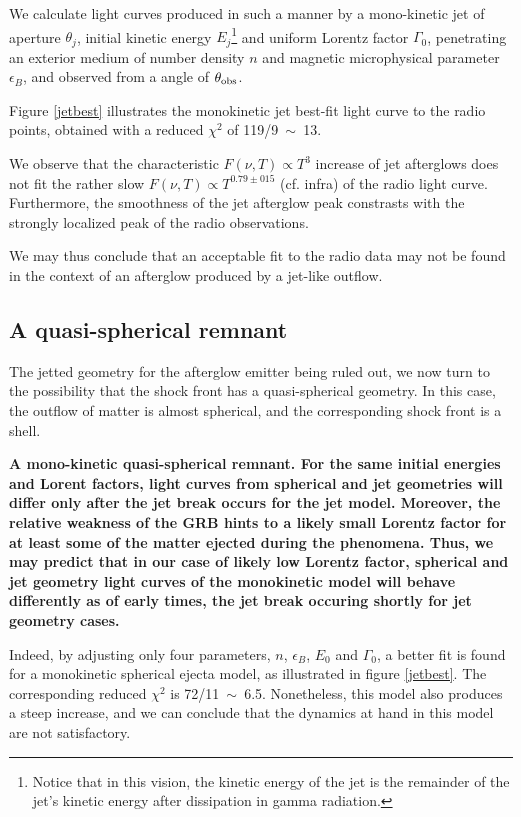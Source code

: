 We calculate light curves produced in such a manner by a mono-kinetic jet of aperture $\theta_j$, initial kinetic energy $E_j$\footnote{Notice that in this vision, the kinetic energy of the jet is the remainder of the jet's kinetic energy after dissipation in gamma radiation.} and uniform Lorentz factor $\Gamma_0$, penetrating an exterior medium of number density $n$ and magnetic microphysical parameter $\epsilon_B$, and observed from a angle of $\theta_{\rm{obs}}$.


Figure \ref{jetbest} illustrates the monokinetic jet best-fit light curve to the radio points, obtained with a reduced $\chi^2$ of 119/9~$\sim$~13.

We observe that the characteristic $F(\nu, T) \propto T^3$ increase of jet afterglows does not fit the rather slow $F(\nu, T) \propto T^{0.79\pm015}$ (cf. infra) of the radio light curve. Furthermore, the smoothness of the jet afterglow peak constrasts with the strongly localized peak of the radio observations.

We may thus conclude that an acceptable fit to the radio data may not be found in the context of an afterglow produced by a jet-like outflow.


\subsection{A quasi-spherical remnant}
\label{QSR}
The jetted geometry for the afterglow emitter being ruled out, we now turn to the possibility that the shock front has a quasi-spherical geometry. In this case, the outflow of matter is almost spherical, and the corresponding shock front is a shell.

\bf{A mono-kinetic quasi-spherical remnant. }For the same initial energies and Lorent factors, light curves from spherical and jet geometries will differ only after the jet break occurs for the jet model. Moreover, the relative weakness of the GRB hints to a likely small Lorentz factor for at least some of the matter ejected during the phenomena. Thus, we may predict that in our case of likely low Lorentz factor, spherical and jet geometry light curves of the monokinetic model will behave differently as of early times, the jet break occuring shortly for jet geometry cases.

Indeed, by adjusting only four parameters, $n$, $\epsilon_B$, $E_0$ and $\Gamma_0$, a better fit is found for a monokinetic spherical ejecta model, as illustrated in figure \ref{jetbest}. The corresponding reduced $\chi^2$ is 72/11~$\sim$~6.5. Nonetheless, this model also produces a steep increase, and we can conclude that the dynamics at hand in this model are not satisfactory.

